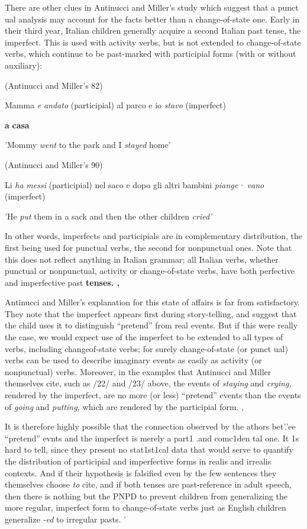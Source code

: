 There are other clues in Antinucci and Miller's study which 
suggest that a punct ual analysis may account for the facts better than a change-of-state one. Early in their third year, Italian children gener\-ally acquire a second Italian past tense, the imperfect. This is used with activity verbs, but is not extended to change-of-state verbs, which continue to be past-marked with participial forms (with or without auxiliary):

\ea\label{ex:22}
 (Antinucci and Miller's 82)
\glt
\z

Mamma \textit{e} \textit{andato} (participial) al parco e io \textit{stavo} (imperfect)

\textbf{a} \textbf{casa}

'Mommy \textit{went} to the park and I \textit{stayed} home'

\ea\label{ex:23}
 (Antinucci and Miller's 90)
\glt
\z

Li \textit{ha} \textit{messi }(participial) nel saco e dopo gli altri bambini \textit{piange·} \textit{vano }(imperfect)

'He \textit{put} them in a sack and then the other children \textit{cried'}

In other words, imperfects and participials are in complementary distribution, the first being used for punctual verbs, the second for nonpunctual ones. Note that this does not reflect anything in Italian grammar; all Italian verbs, whether punctual or nonpunctual, activity or change-of-state verbs, have both perfective and imperfective past \textbf{tenses. ,}

Antinucci and Miller's explanation for this state of affairs is far from satisfactory. They note that the imperfect appears first during story-telling, and suggest that the child uses it to distinguish ``pretend'' from real events. But if this were really the case, we would expect use of the imperfect to be extended to all types of verbs, including change\-of-state verbs; for surely change-of-state (or punct ual) verbs can be used to describe imaginary events as easily as activity (or nonpunctual) verbs. Moreover, in the examples that Antinucci and Miller them\-selves cite, such as /22/ and /23/ above, the events of \textit{staying }and \textit{crying,} rendered by the imperfect, are no more (or less) ``pretend'' events than the events of \textit{going} and \textit{putting, }which are rendered by the participial form. ,


It is therefore highly possible that the connection observed by the athors bet{\textquotedbl}'.'ee ``pretend'' evnts and the imperfect is merely a part1 .and comc1den tal one. It 1s hard to tell, since they present no stat1st1cal data that would serve to quantify the distribution of participial and imperfective forms in realis and irrealis contexts. And if their hypothesis is falsified even by the few sentences they themselves choose \textit{to} cite, and if both tenses are past-reference in adult speech, then there is nothing but the PNPD to prevent children from general\-izing the more regular, imperfect form to change-of-state verbs just as English children generalize \textit{{}-ed} to irregular pasts. '

